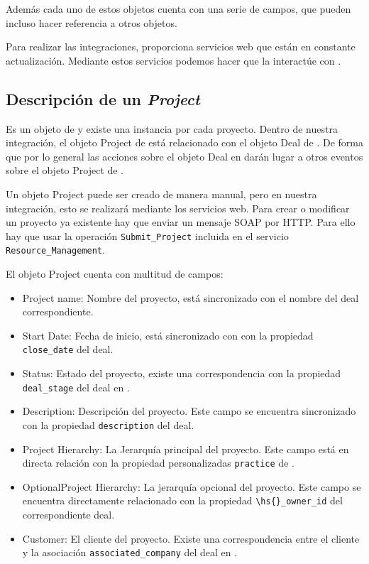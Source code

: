 Además cada uno de estos objetos cuenta con una serie de campos, que pueden incluso hacer referencia a otros objetos.


Para realizar las integraciones, \wday{} proporciona servicios web que están en constante actualización.
Mediante estos servicios podemos hacer que la \iface{} interactúe con \wday.



\subsection{Descripción de un \textit{Project}}
Es un objeto de \wday{} y existe una instancia por cada proyecto. Dentro de nuestra integración, 
el objeto Project de \wday{} está relacionado con el objeto Deal de \hs. 
De forma que por lo general las acciones sobre el objeto Deal en \hs{} darán lugar a otros eventos
 sobre el objeto Project de \wday.
 
Un objeto Project puede ser creado de manera manual, pero en nuestra integración, esto se realizará mediante los servicios web.
Para crear o modificar un proyecto ya existente hay que enviar un mensaje SOAP por HTTP. 
Para ello hay que usar la operación \verb|Submit_Project|  incluida en el servicio \verb|Resource_Management|.

El objeto Project cuenta con multitud de campos: 

\begin{itemize}
\item Project name: Nombre del proyecto, está sincronizado con el nombre del deal correspondiente.
\item Start Date: Fecha de inicio, está sincronizado con con la propiedad \verb|close_date| del deal.
\item Status: Estado del proyecto, existe una correspondencia con la propiedad \verb|deal_stage| del deal en \hs.
\item Description: Descripción del proyecto. Este campo se encuentra sincronizado con la propiedad \verb|description| del deal.

\item Project Hierarchy: La Jerarquía principal del proyecto. Este campo está en directa relación con la propiedad personalizadas
\verb|practice| de \hs.
\item OptionalProject Hierarchy: La jerarquía opcional del proyecto. Este campo se encuentra directamente relacionado con la propiedad \verb|\hs{}_owner_id| del correspondiente deal.
\item Customer: El cliente del proyecto. Existe una correspondencia entre el cliente y la asociación \verb|associated_company| del deal en \hs.

\end{itemize}




